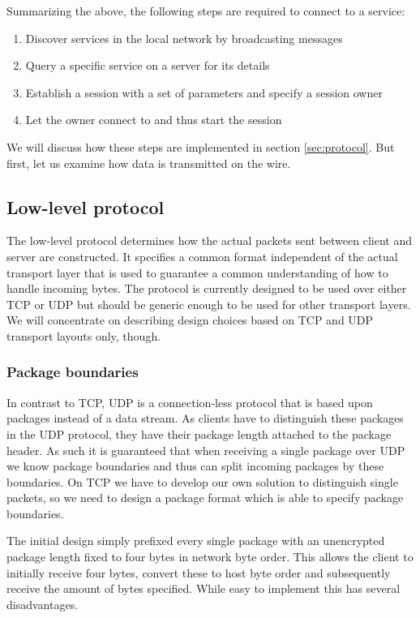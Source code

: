 Summarizing the above, the following steps are required to connect to a service:
\begin{enumerate}
    \item Discover services in the local network by broadcasting messages
    \item Query a specific service on a server for its details
    \item Establish a session with a set of parameters and specify a session owner
    \item Let the owner connect to and thus start the session
\end{enumerate}

We will discuss how these steps are implemented in section \ref{sec:protocol}.
But first, let us examine how data is transmitted on the wire.

\subsection{Low-level protocol}
\label{sec:low-level-protocol}

The low-level protocol determines how the actual packets sent between client and server are constructed.
It specifies a common format independent of the actual transport layer that is used to guarantee a common understanding of how to handle incoming bytes.
The protocol is currently designed to be used over either TCP or UDP but should be generic enough to be used for other transport layers.
We will concentrate on describing design choices based on TCP and UDP transport layouts only, though.

\subsubsection{Package boundaries}

In contrast to TCP, UDP is a connection-less protocol that is based upon packages instead of a data stream.
As clients have to distinguish these packages in the UDP protocol, they have their package length attached to the package header.
As such it is guaranteed that when receiving a single package over UDP we know package boundaries and thus can split incoming packages by these boundaries.
On TCP we have to develop our own solution to distinguish single packets, so we need to design a package format which is able to specify package boundaries.

The initial design simply prefixed every single package with an unencrypted package length fixed to four bytes in network byte order.
This allows the client to initially receive four bytes, convert these to host byte order and subsequently receive the amount of bytes specified.
While easy to implement this has several disadvantages.

